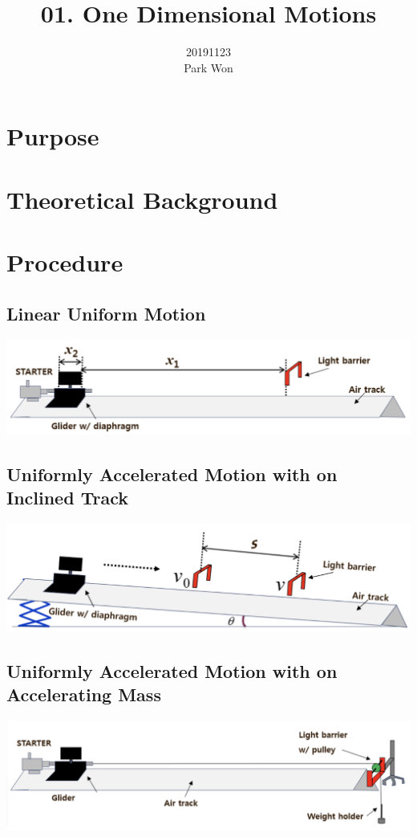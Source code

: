 \documentclass{article}
\title{01. One Dimensional Motions}
\author{20191123\\Park Won}
\date{}
\begin{document}
\maketitle

\section{Purpose}


\section{Theoretical Background}


\section{Procedure}

\subsection{Linear Uniform Motion}


\includegraphics[width=\columnwidth]{A.png}


\subsection{Uniformly Accelerated Motion with on Inclined Track}


\includegraphics[width=\columnwidth]{B.png}


\subsection{Uniformly Accelerated Motion with on Accelerating Mass}


\includegraphics[width=\columnwidth]{C.png}
\end{document}
